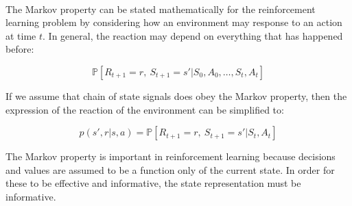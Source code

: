 \documentclass{article}
\begin{document}
 \
 
 The Markov property can be stated mathematically for the reinforcement learning problem by considering how an environment may response to an action at time $t$. In general, the reaction may depend on everything that has happened before:
 
 \begin{equation}
 	\mathbb{P}[ R_{t+1} = r, \ S_{t+1} = s' | S_0, A_0, \hdots, S_t, A_t]
 \end{equation}
 
 If we assume that chain of state signals does obey the Markov property, then the expression of the reaction of the environment can be simplified to:
 
 \begin{equation}
 	p(s', r | s, a) = \mathbb{P}[ R_{t+1} = r, \ S_{t+1} = s' | S_t, A_t]
 \end{equation}
 
 The Markov property is important in reinforcement learning because decisions and values are assumed to be a function only of the current state. In order for these to be effective and informative, the state representation must be informative. \citep{sutton2018reinforcement}
\end{document}
